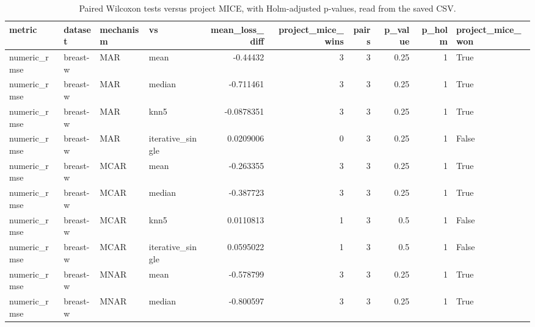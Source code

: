 \begin{table}[ht]
\centering
\caption{Paired Wilcoxon tests versus project MICE, with Holm-adjusted p-values, read from the saved CSV.}
\label{tab:protocol_a_significance}
\begin{tabular}{llllrrrrrl}
\hline
 metric                 & dataset         & mechanism   & vs               &   mean\_loss\_diff &   project\_mice\_wins &   pairs &   p\_value &   p\_holm & project\_mice\_won   \\
\hline
 numeric\_rmse           & breast-w        & MAR         & mean             &     -0.44432     &                   3 &       3 &      0.25 &        1 & True               \\
 numeric\_rmse           & breast-w        & MAR         & median           &     -0.711461    &                   3 &       3 &      0.25 &        1 & True               \\
 numeric\_rmse           & breast-w        & MAR         & knn5             &     -0.0878351   &                   3 &       3 &      0.25 &        1 & True               \\
 numeric\_rmse           & breast-w        & MAR         & iterative\_single &      0.0209006   &                   0 &       3 &      0.25 &        1 & False              \\
 numeric\_rmse           & breast-w        & MCAR        & mean             &     -0.263355    &                   3 &       3 &      0.25 &        1 & True               \\
 numeric\_rmse           & breast-w        & MCAR        & median           &     -0.387723    &                   3 &       3 &      0.25 &        1 & True               \\
 numeric\_rmse           & breast-w        & MCAR        & knn5             &      0.0110813   &                   1 &       3 &      0.5  &        1 & False              \\
 numeric\_rmse           & breast-w        & MCAR        & iterative\_single &      0.0595022   &                   1 &       3 &      0.5  &        1 & False              \\
 numeric\_rmse           & breast-w        & MNAR        & mean             &     -0.578799    &                   3 &       3 &      0.25 &        1 & True               \\
 numeric\_rmse           & breast-w        & MNAR        & median           &     -0.800597    &                   3 &       3 &      0.25 &        1 & True               \\

\end{tabular}
\end{table}

